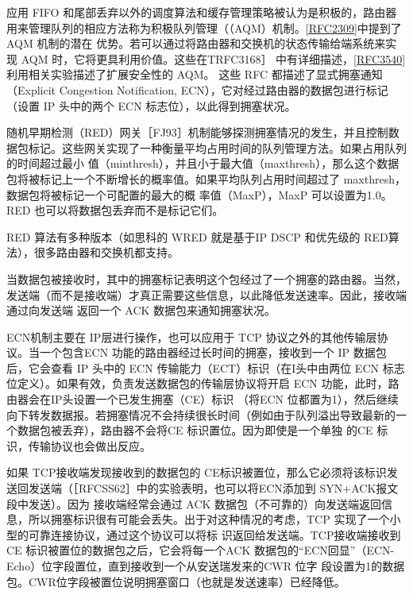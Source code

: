 应用 FIFO 和尾部丢弃以外的调度算法和缓存管理策略被认为是积极的，路由器用来管理队列的相应方法称为积极队列管理（（AQM）机制。\href{https://www.rfc-editor.org/rfc/rfc2309}{[RFC2309]}中提到了AQM 机制的潜在
优势。若可以通过将路由器和交换机的状态传输给端系统来实现 AQM 时，它将更具利用价值。这些在TRFC3168］ 中有详细描述，\href{https://www.rfc-editor.org/rfc/rfc3540}{[RFC3540]}利用相关实验描述了扩展安全性的 AQM。
这些 RFC 都描述了显式拥塞通知（Explicit Congestion Notification, ECN），它对经过路由器的数据包进行标记（设置 IP 头中的两个 ECN 标志位），以此得到拥塞状况。

随机早期检测（RED）网关［FJ93］机制能够探测拥塞情况的发生，并且控制数据包标记。这些网关实现了一种衡量平均占用时间的队列管理方法。如果占用队列的时间超过最小
值（minthresh），并且小于最大值（maxthresh），那么这个数据包将被标记上一个不断增长的概率值。如果平均队列占用时间超过了 maxthresh，数据包将被标记一个可配置的最大的概
率值（MaxP），MaxP 可以设置为1.0。RED 也可以将数据包丢弃而不是标记它们。

\begin{tcolorbox}
    RED 算法有多种版本（如思科的 WRED 就是基于IP DSCP 和优先级的 RED算法），很多路由器和交换机都支持。
\end{tcolorbox}

当数据包被接收时，其中的拥塞标记表明这个包经过了一个拥塞的路由器。当然，发送端（而不是接收端）才真正需要这些信息，以此降低发送速率。因此，接收端通过向发送端
返回一个 ACK 数据包来通知拥塞状况。

ECN机制主要在 IP层进行操作，也可以应用于 TCP 协议之外的其他传输层协议。当一个包含ECN 功能的路由器经过长时间的拥塞，接收到一个 IP 数据包后，它会查看 IP 头中的
ECN 传输能力（ECT）标识（在I头中由两位 ECN 标志位定义）。如果有效，负责发送数据包的传输层协议将开启 ECN 功能，此时，路由器会在IP头设置一个已发生拥塞（CE）标识
（将ECN 位都置为1），然后继续向下转发数据报。若拥塞情况不会持续很长时间（例如由于队列溢出导致最新的一个数据包被丢弃），路由器不会将CE 标识置位。因为即使是一个单独
的CE 标识，传输协议也会做出反应。

如果 TCP接收端发现接收到的数据包的 CE标识被置位，那么它必须将该标识发送回发送端（［RFCSS62］中的实验表明，也可以将ECN添加到 SYN+ACK报文段中发送）。因为
接收端经常会通过 ACK 数据包（不可靠的）向发送端返回信息，所以拥塞标识很有可能会丢失。出于对这种情况的考虑，TCP 实现了一个小型的可靠连接协议，通过这个协议可以将标
识返回给发送端。TCP接收端接收到 CE 标识被置位的数据包之后，它会将每一个ACK 数据包的“ECN回显”（ECN-Echo）位字段置位，直到接收到一个从安送瑞发来的CWR 位字
段设置为1的数据包。CWR位字段被置位说明拥塞窗口（也就是发送速率）已经降低。


